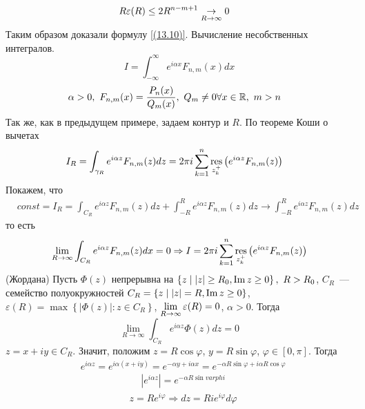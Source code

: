 \begin{align*}
  & R\varepsilon(R) \leq 2R^{n-m+1} \underset{R \to \infty}{\to} 0
\end{align*}
Таким образом доказали формулу \eqref{(13.10)}.
\Example
Вычисление несобственных интегралов.
\begin{equation}\label{(13.11)}
  I = \int_{-\infty}^{\infty}e^{i\alpha x}F_{n,m}(x)dx
\end{equation}
\begin{align*}
  & \alpha > 0, \ F_{n,m}(x) = \frac{P_n(x)}{Q_m(x)}, \ Q_m \neq 0 \forall x \in \mathbb{R}, \ m > n
\end{align*}
Так же, как в предыдущем примере, задаем контур и $R$. По теореме Коши о вычетах
\begin{align*}
  & I_R = \int_{\gamma_R}e^{i\alpha z}F_{n,m}(z) dz = 2 \pi i \sum_{k=1}^n\underset{z_k^+}{\mathrm{res}}\left( e^{i\alpha z} F_{n,m}(z)\right)
\end{align*}
Покажем, что
\begin{align*}
  & const = I_R = \int_{C_R}e^{i\alpha z}F_{n,m}(z) dz + \int_{-R}^Re^{i\alpha z}F_{n,m}(z) dz \to \int_{-R}^Re^{i\alpha z}F_{n,m}(z) dz
\end{align*}
то есть
\begin{equation}\label{(13.12)}
    \lim_{R \to \infty} \int_{C_R}e^{i\alpha z}F_{n,m}(z)dx = 0 \Rightarrow I = 2 \pi i \sum_{k=1}^n \underset{z_k^+}{\mathrm{res}}\left( e^{i \alpha z}F_{n,m}(z) \right)
\end{equation}
\lemma (Жордана)
Пусть $\Phi(z)$ непрерывна на $\left\{ z \mid \left| z \right| \geq R_0, \mathrm{Im}\, z
    \geq 0 \right\}, \ R > R_0$, $C_R$~--- семейство полуокружностей $C_R = \{z
\mid \left| z \right| = R, \mathrm{Im}\, z \geq 0\}$, $ \varepsilon(R) = \max \left\{
    \left| \Phi(z) \right| : z \in C_R \right\}$, $ \displaystyle \lim_{R \to \infty}
\varepsilon(R) = 0$, $\alpha > 0$. Тогда
\begin{equation}\label{(13.13)}
    \lim_{R \to \infty}\int_{C_R}e^{i \alpha z}\Phi(z)dz = 0
\end{equation}
\pr
$z = x + iy \in C_R$. Значит, положим $z = R \cos \varphi$, $y = R \sin \varphi$,
$ \varphi \in [0,\pi]$. Тогда
\begin{align*}
  & e^{i \alpha z} = e^{i \alpha(x+iy)} = e^{-\alpha y + i \alpha x} = e^{-\alpha R \sin \varphi + i \alpha R \cos \varphi}
\end{align*}
\begin{align*}
  & \left| e^{i \alpha z} \right| = e^{-\alpha R \sin varphi}
\end{align*}
\begin{align*}
  & z = R e^{i \varphi} \Rightarrow dz = R i e^{i \varphi} d \varphi
\end{align*}
